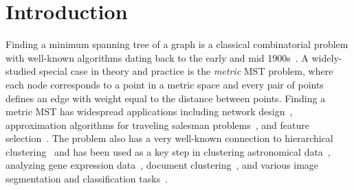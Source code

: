 \section{Introduction}
\label{sec:intro}
Finding a minimum spanning tree of a graph is a classical combinatorial problem with well-known algorithms dating back to the early and mid 1900s~\cite{boruvka1926jistem,prim1957shortest,kruskal1956shortest}. A widely-studied special case in theory and practice is the \emph{metric} MST problem, where each node corresponds to a point in a metric space and every pair of points defines an edge with weight equal to the distance between points. Finding a metric MST has widespread applications including network design~\cite{loberman1957formal}, approximation algorithms for traveling salesman problems~\cite{held1970traveling}, and feature selection~\cite{labbe2023dendrograms}. The problem also has a very well-known connection to hierarchical clustering~\cite{gower1969minimum} and has been used as a key step in clustering astronomical data~\cite{barrow1985minimal,march2010fast}, analyzing gene expression data~\cite{xu2002clustering}, document clustering~\cite{xu19972d}, and various image segmentation and classification tasks~\cite{xu19972d,an2000fast,la2022ocmst}.


